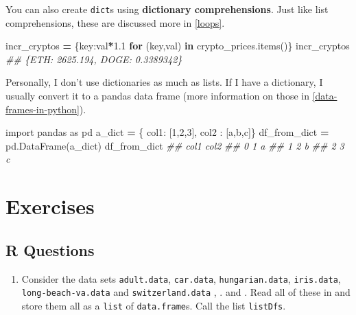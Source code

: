 \documentclass[
  12pt,
  krantz2]{krantz}
\makeatletter
\newenvironment{Shaded}{\begin{snugshade}}{\end{snugshade}}
\newcommand{\CommentTok}[1]{\textcolor[rgb]{0.37,0.37,0.37}{\textit{#1}}}
\newcommand{\ControlFlowTok}[1]{\textcolor[rgb]{0.27,0.27,0.27}{\textbf{#1}}}
\newcommand{\DecValTok}[1]{\textcolor[rgb]{0.06,0.06,0.06}{#1}}
\newcommand{\FloatTok}[1]{\textcolor[rgb]{0.06,0.06,0.06}{#1}}
\newcommand{\ImportTok}[1]{#1}
\newcommand{\KeywordTok}[1]{\textcolor[rgb]{0.27,0.27,0.27}{\textbf{#1}}}
\newcommand{\NormalTok}[1]{#1}
\newcommand{\OperatorTok}[1]{\textcolor[rgb]{0.43,0.43,0.43}{\textbf{#1}}}
\newcommand{\StringTok}[1]{\textcolor[rgb]{0.5,0.5,0.5}{#1}}
\providecommand{\tightlist}{%
  \setlength{\itemsep}{0pt}\setlength{\parskip}{0pt}}
\newenvironment{kframe}{%
\medskip{}
\setlength{\fboxsep}{.8em}
 \def\at@end@of@kframe{}%
 \ifinner\ifhmode%
  \def\at@end@of@kframe{\end{minipage}}%
  \begin{minipage}{\columnwidth}%
 \fi\fi%
 \def\FrameCommand##1{\hskip\@totalleftmargin \hskip-\fboxsep
 \colorbox{shadecolor}{##1}\hskip-\fboxsep
     \hskip-\linewidth \hskip-\@totalleftmargin \hskip\columnwidth}%
 \MakeFramed {\advance\hsize-\width
   \@totalleftmargin\z@ \linewidth\hsize
   \@setminipage}}%
 {\par\unskip\endMakeFramed%
 \at@end@of@kframe}
\renewenvironment{Shaded}{\begin{kframe}}{\end{kframe}}
\makeatother
\begin{document}
You can also create \texttt{dict}s using \textbf{dictionary comprehensions}. Just like list comprehensions, these are discussed more in \ref{loops}.

\begin{Shaded}
\begin{Highlighting}[]
\NormalTok{incr\_cryptos }\OperatorTok{=}\NormalTok{ \{key:val}\OperatorTok{*}\FloatTok{1.1} \ControlFlowTok{for}\NormalTok{ (key,val) }\KeywordTok{in}\NormalTok{ crypto\_prices.items()\}}
\NormalTok{incr\_cryptos}
\CommentTok{\#\# \{\textquotesingle{}ETH\textquotesingle{}: 2625.194, \textquotesingle{}DOGE\textquotesingle{}: 0.3389342\}}
\end{Highlighting}
\end{Shaded}

Personally, I don't use dictionaries as much as lists. If I have a dictionary, I usually convert it to a pandas data frame (more information on those in \ref{data-frames-in-python}).

\begin{Shaded}
\begin{Highlighting}[]
\ImportTok{import}\NormalTok{ pandas }\ImportTok{as}\NormalTok{ pd}
\NormalTok{a\_dict }\OperatorTok{=}\NormalTok{ \{ }\StringTok{\textquotesingle{}col1\textquotesingle{}}\NormalTok{: [}\DecValTok{1}\NormalTok{,}\DecValTok{2}\NormalTok{,}\DecValTok{3}\NormalTok{], }\StringTok{\textquotesingle{}col2\textquotesingle{}}\NormalTok{ : [}\StringTok{\textquotesingle{}a\textquotesingle{}}\NormalTok{,}\StringTok{\textquotesingle{}b\textquotesingle{}}\NormalTok{,}\StringTok{\textquotesingle{}c\textquotesingle{}}\NormalTok{]\}}
\NormalTok{df\_from\_dict }\OperatorTok{=}\NormalTok{ pd.DataFrame(a\_dict)}
\NormalTok{df\_from\_dict}
\CommentTok{\#\#    col1 col2}
\CommentTok{\#\# 0     1    a}
\CommentTok{\#\# 1     2    b}
\CommentTok{\#\# 2     3    c}
\end{Highlighting}
\end{Shaded}

\hypertarget{exercises-3}{%
\section{Exercises}\label{exercises-3}}

\hypertarget{r-questions-3}{%
\subsection{R Questions}\label{r-questions-3}}

\begin{enumerate}
\def\labelenumi{\arabic{enumi}.}
\tightlist
\item
  Consider the data sets \texttt{adult.data}, \texttt{car.data}, \texttt{hungarian.data}, \texttt{iris.data}, \texttt{long-beach-va.data} and \texttt{switzerland.data} \citep{misc_heart_disease_45}, \citep{misc_iris_53}. \citep{misc_adult_2} and \citep{misc_car_evaluation_19}. Read all of these in and store them all as a \texttt{list} of \texttt{data.frame}s. Call the list \texttt{listDfs}.
\end{enumerate}
\end{document}
